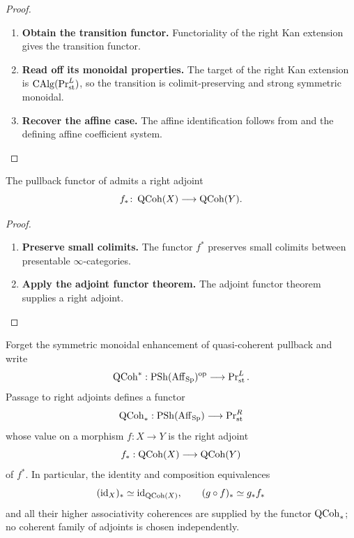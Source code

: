 \begin{proof}
\leavevmode
\begin{enumerate}[label=\textup{(\arabic*)}]
    \item \textbf{Obtain the transition functor.}
    Functoriality of the right Kan extension gives the transition functor.

    \item \textbf{Read off its monoidal properties.}
    The target of the right Kan extension is
    $\operatorname{CAlg}(\operatorname{Pr}^L_{\mathrm{st}})$, so the transition is colimit-preserving and
    strong symmetric monoidal.

    \item \textbf{Recover the affine case.}
    The affine identification follows from
     and the defining affine coefficient
    system.
\end{enumerate}
\end{proof}

\begin{corollary}
\label{cor:qcoh-direct-image}
The pullback functor of  admits a right adjoint
\[
    f_*
    \colon
    \operatorname{QCoh}(X)
    \longrightarrow
    \operatorname{QCoh}(Y).
\]
\end{corollary}

\begin{proof}
\leavevmode
\begin{enumerate}[label=\textup{(\arabic*)}]
    \item \textbf{Preserve small colimits.}
    The functor $f^*$ preserves small colimits between presentable
    $\infty$-categories.

    \item \textbf{Apply the adjoint functor theorem.}
    The adjoint functor theorem supplies a right adjoint.
\end{enumerate}
\end{proof}

\begin{proposition}
\label{prop:qcoh-coherent-direct-image}
Forget the symmetric monoidal enhancement of quasi-coherent pullback and write
\[
    \operatorname{QCoh}^*
    :
    \operatorname{PSh}(\operatorname{Aff}_{\operatorname{Sp}})^{\mathrm{op}}
    \longrightarrow
    \operatorname{Pr}^L_{\mathrm{st}}.
\]
Passage to right adjoints defines a functor
\[
    \operatorname{QCoh}_*
    :
    \operatorname{PSh}(\operatorname{Aff}_{\operatorname{Sp}})
    \longrightarrow
    \operatorname{Pr}^R_{\mathrm{st}}
\]
whose value on a morphism
\(f:X\to Y\) is the right adjoint
\[
    f_*:\operatorname{QCoh}(X)\longrightarrow\operatorname{QCoh}(Y)
\]
of \(f^*\). In particular, the identity and composition equivalences
\[
    (\operatorname{id}_X)_*\simeq\operatorname{id}_{\operatorname{QCoh}(X)},
    \qquad
    (g\circ f)_*\simeq g_*f_*
\]
and all their higher associativity coherences are supplied by the functor
\(\operatorname{QCoh}_*\); no coherent family of adjoints is chosen independently.
\end{proposition}

